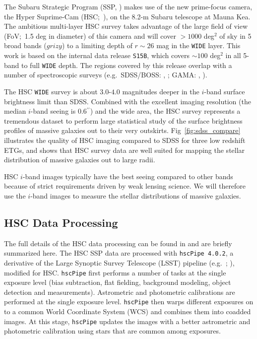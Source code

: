 \documentclass[a4paper,fleqn,usenatbib]{mnras}
\def\asec{$^{\prime\prime}$}
\begin{document}
    The Subaru Strategic Program (SSP, \citealt{HSC_SSP, HSC_DR1}) makes use of the 
    new prime-focus camera, the Hyper Suprime-Cam (HSC;~\citealt{Miyazaki2012}), on the 
    8.2-m Subaru telescope at Mauna Kea. 
    The ambitious multi-layer HSC survey takes advantage of the large field of 
    view (FoV;~1.5 deg in diameter) of this camera and will cover $>1000$ deg$^2$ 
    of sky in 5 broad bands ($grizy$) to a limiting depth of $r {\sim} 26$ mag 
    in the \texttt{WIDE} layer. 
    This work is based on the internal data release \texttt{S15B}, which covers 
    ${\sim} 100$ deg$^2$ in all 5-band to full \texttt{WIDE} depth.  
    The regions covered by this release overlap with a number of spectroscopic surveys 
    (e.g.\ SDSS/BOSS: \citealt{Eisenstein2011}, \citealt{Alam2015}; 
    GAMA: \citealt{Driver2011}, \citealt{Liske2015}).

    The HSC \texttt{WIDE} survey is about $3.0$-$4.0$ magnitudes deeper in the 
    $i$-band surface brightness limit than SDSS. 
    Combined with the excellent imaging resolution (the median $i$-band seeing is 
    0.6\asec) and the wide area, the HSC survey represents a tremendous dataset to 
    perform large statistical study of the surface brightness profiles of massive
    galaxies out to their very outskirts.     
    Fig~\ref{fig:sdss_compare} illustrates the quality of HSC imaging compared to SDSS 
    for three low redshift ETGs, and shows that HSC survey data are well suited for 
    mapping the stellar distribution of massive galaxies out to large radii.

	HSC $i$-band images typically have the best seeing compared to other bands because 
	of strict requirements driven by weak lensing science. 
    We will therefore use the $i$-band images to measure the stellar distributions of 
    massive galaxies.
    
\subsection{HSC Data Processing}
    \label{sec:pipeline}

    The full details of the HSC data processing can be found in \citet{Bosch2017}
    and are briefly summarized here. 
    The HSC SSP data are processed with \texttt{hscPipe 4.0.2}, a derivative of the 
    Large Synoptic Survey Telescope (LSST) pipeline (e.g.\ \citealt{Juric2015}; 
    \citealt{Axelrod2010}), modified for HSC. 
    \texttt{hscPipe} first performs a number of tasks at the single exposure level 
    (bias subtraction, flat fielding, background modeling, object detection and 
    measurements). 
    Astrometric and photometric calibrations are performed at the single exposure 
    level. 
    \texttt{hscPipe} then warps different exposures on to a common World Coordinate 
    System (WCS) and combines them into coadded images. 
    At this stage, \texttt{hscPipe} updates the images with a better astrometric and 
    photometric calibration using stars that are common among exposures. 
    
\end{document}
